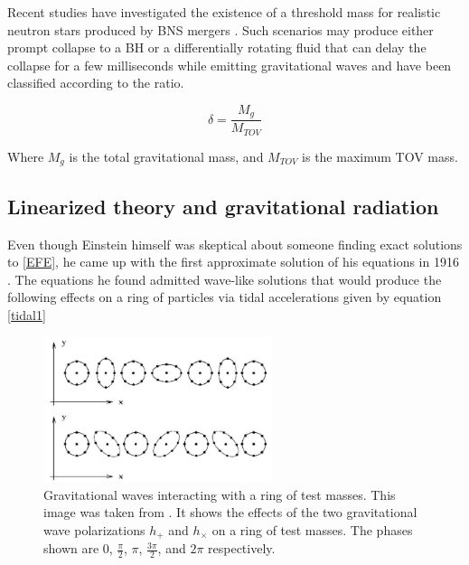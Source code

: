 \FloatBarrier

Recent studies have investigated the existence of a threshold mass for realistic neutron stars produced by BNS mergers \cite{Kashyap_2022}. Such scenarios may produce either prompt collapse to a BH or a differentially rotating fluid that can delay the collapse for a few milliseconds while emitting gravitational waves and have been classified according to the ratio.

\begin{equation}\label{delta}
\delta=\frac{M_g}{M_{TOV}}
\end{equation} 

Where $M_g$ is the total gravitational mass, and $M_{TOV}$ is the maximum TOV mass.





\subsection{Linearized theory and gravitational radiation}\label{GW}

Even though Einstein himself was skeptical about someone finding exact solutions to \ref{EFE}, he came up with the first approximate solution of his equations in 1916 \cite{Einstein:1916cc}. The equations he found admitted wave-like solutions that would produce the following effects on a ring of particles via tidal accelerations given by equation \ref{tidal1}


\begin{figure}[hbt!]
\begin{center}
\includegraphics[width=0.6\textwidth, angle=0]{images/particle-ring.png}
\captionsetup{width=0.8\textwidth}
\caption[Gravitational waves interacting with a ring of test masses]{Gravitational waves interacting with a ring of test masses. This image was taken from \cite{carroll-notes}.  It shows the effects of the two gravitational wave polarizations $h_+$ and $h_\times$ on a ring of test masses. The phases shown are 0, $\frac{\pi}{2}$, $\pi$, $\frac{3\pi}{2}$, and $2\pi$ respectively.}
\label{GW passing through a ring of test masses}
\end{center}
\end{figure}

